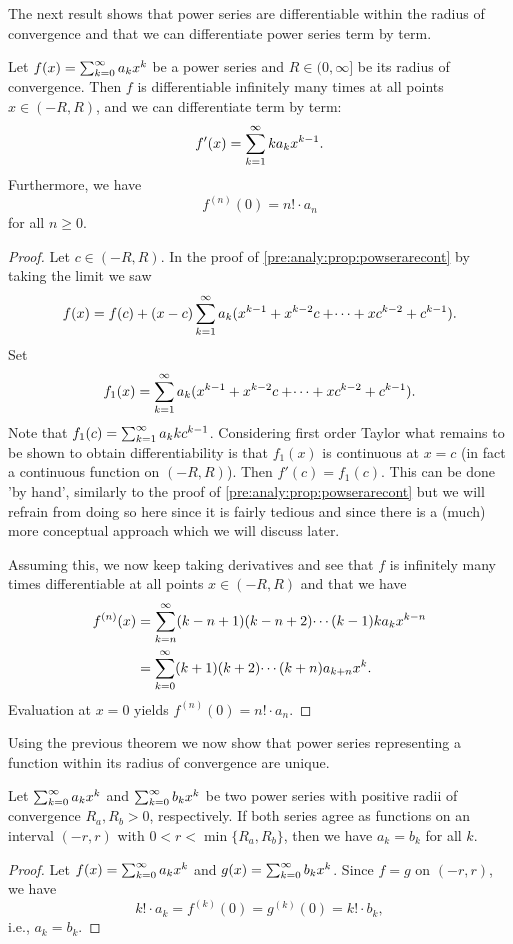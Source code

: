 \documentclass[10pt, a4paper]{article}
\begin{document}
The next result shows that power series are differentiable within the radius of convergence and that we can differentiate power series term by term.

\begin{theorem}\label{pre:analy:thm:funcofpowseriesinfdiff}
    Let $f(x) = \infsumo a_kx ^ k$ be a power series and $R \in (0, \infty]$ be its radius of convergence.
    Then $f$ is differentiable infinitely many times at all points $x \in (-R, R)$,
    and we can differentiate term by term:
    \[
    f'(x) = \infsum ka_kx ^ {k - 1}.
    \]
    Furthermore,
    we have
    \[
    f ^ {(n)}(0) = n! \cdot a_n
    \]
    for all $n \geq 0$.
    \begin{proof}
        Let $c \in (-R, R)$.
        In the proof of \autoref{pre:analy:prop:powserarecont} by taking the limit we saw
        \[
        f(x) = f(c) + (x - c)\infsum a_k(x ^ {k - 1} + x ^ {k - 2}c + \dotsi + xc ^ {k - 2} + c ^ {k - 1}).
        \]
        Set
        \[
        f_1(x) = \infsum a_k(x ^ {k - 1} + x ^ {k - 2}c + \dotsi + xc ^ {k - 2} + c ^ {k - 1}).
        \]
         Note that $f_1(c) = \infsum a_kkc ^ {k - 1}$.
         Considering first order Taylor what remains to be shown to obtain differentiability is that $f_1(x)$ is continuous at $x = c$
         (in fact a continuous function on $(-R, R)$).
         Then $f'(c) = f_1(c)$.
         This can be done 'by hand',
         similarly to the proof of \autoref{pre:analy:prop:powserarecont} but we will refrain from doing so here since it is fairly tedious and since there is a
         (much)
         more conceptual approach which we will discuss later.

         Assuming this,
         we now keep taking derivatives and see that $f$ is infinitely many times differentiable at all points $x \in (-R, R)$ and that we have
         \begin{align*}
             f ^ {(n)}(x) &= \infsum[k = n](k - n + 1)(k - n + 2)\dotsi(k - 1)ka_kx ^ {k - n} \\
             &= \infsumo(k + 1)(k + 2)\dotsi(k + n)a_{k + n}x ^ k.
         \end{align*}
         Evaluation at $x = 0$ yields $f ^ {(n)}(0) = n! \cdot a_n$.
    \end{proof}
\end{theorem}

Using the previous theorem we now show that power series representing a function within its radius of convergence are unique.
\begin{theorem}
    Let $\infsumo a_kx ^ k$ and $\infsumo b_kx ^ k$ be two power series with positive radii of convergence $R_a, R_b > 0$,
    respectively.
    If both series agree as functions on an interval $(-r, r)$ with $0 < r < \min\{R_a, R_b\}$,
    then we have $a_k = b_k$ for all $k$.
    \begin{proof}
        Let $f(x) = \infsumo a_kx ^ k$ and $g(x) = \infsumo b_kx ^ k$.
        Since $f = g$ on $(-r, r)$,
        we have
        \[
        k! \cdot a_k = f ^ {(k)}(0) = g ^ {(k)}(0) = k! \cdot b_k,
        \]
        i.e.,
        $a_k = b_k$.
    \end{proof}
\end{theorem}
\end{document}
